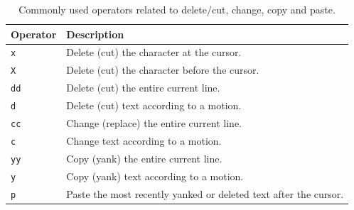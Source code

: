 \begin{table}[!htb]
\centering \caption{Commonly used operators related to delete/cut, change, copy and paste.}\label{ch:tfe:tab:deletecut}
\begin{tabularx}{\textwidth}{lX}
	\hline
	Operator & Description \\ \hline
	\verb|x| & Delete (cut) the character at the cursor. \\ 
	\verb|X| & Delete (cut) the character before the cursor. \\ 
	\verb|dd| & Delete (cut) the entire current line. \\ 
	\verb|d| & Delete (cut) text according to a motion. \\ 
	\verb|cc| & Change (replace) the entire current line. \\ 
	\verb|c| & Change text according to a motion. \\ 
	\verb|yy| & Copy (yank) the entire current line. \\ 
	\verb|y| & Copy (yank) text according to a motion. \\ 
	\verb|p| & Paste the most recently yanked or deleted text after the cursor. \\ 
	\hline
\end{tabularx}
\end{table}

